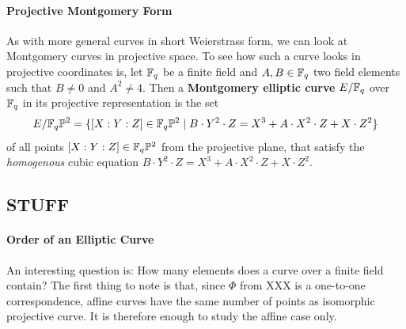 \paragraph{Projective Montgomery Form}
As with more general curves in short Weierstrass form, we can look at Montgomery curves in projective space. To see how such a curve looks in projective coordinates is, let $\mathbb{F}_{q}$ be a finite field and $A,B\in \mathbb{F}_q$ two field elements such that $B\neq 0$ and $A^2\neq 4$. Then a \textbf{Montgomery elliptic curve} $E/\mathbb{F}_q$ over $\mathbb{F}_q$ in its projective representation is the set
\begin{equation}
\label{def_short_weierstrass_curve}
E/\mathbb{F}_q\mathbb{P}^2 = \{[X:Y:Z]\in \mathbb{F}_q\mathbb{P}^2\;|\; B\cdot Y^2 \cdot Z = X^3 + A\cdot X^2\cdot Z + X\cdot Z^2  \}
\end{equation}
of all points $[X:Y:Z]\in \mathbb{F}_q\mathbb{P}^2$ from the projective plane, that satisfy the \textit{homogenous} cubic equation $B\cdot Y^2 \cdot Z = X^3 + A\cdot X^2\cdot Z + X\cdot Z^2$.


\subsection{STUFF}
\paragraph{Order of an Elliptic Curve}
An interesting question is: How many elements does a curve over a finite field contain? The first thing to note is that, since $\Phi$ from XXX is a one-to-one correspondence, affine curves have the same number of points as isomorphic projective curve. It is therefore enough to study the affine case only.

